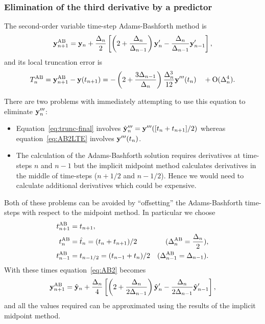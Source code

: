 \subsubsection{Elimination of the third derivative by a predictor}
The second-order variable time-step Adams-Bashforth method is\cite[p.267]{Gresho-Sani}
\begin{equation}
  \mathbf{y}_{n+1}^{\text{AB}} = \mathbf{y}_n + \frac{\Delta_{n}}{2} \left[
    \left (2 + \frac{\Delta_{n}}{\Delta_{n-1}} \right) \mathbf{y}'_n
    - \frac{\Delta_{n}}{\Delta_{n-1}} \mathbf{y}'_{n-1}
    \right],
  \label{eq:AB2}
\end{equation}
and its local truncation error is\cite[p.267]{Gresho-Sani}
\begin{equation}
  T_n^{\text{AB}} = \mathbf{y}_{n+1}^{\text{AB}} - \mathbf{y}(t_{n+1})
  = - \left( 2 + \frac{3 \Delta_{n-1}}{\Delta_{n}} \right) \frac{\Delta_{n}^3}{12} \mathbf{y}'''(t_n)
  \quad + \text{O}(\Delta_{n}^4).
  \label{eq:AB2LTE}
\end{equation}


There are two problems with immediately attempting to use this equation to eliminate $\mathbf{y}'''_n$:
\begin{itemize}
\item Equation~\eqref{eq:trunc-final} involves $\hat{\mathbf{y}}_{n}''' = \mathbf{y}'''([t_n +t_{n+1}]/2)$ whereas equation~\eqref{eq:AB2LTE} involves $\mathbf{y}'''(t_n)$.
\item The calculation of the Adams-Bashforth solution requires derivatives at time-steps $n$ and $n-1$ but the implicit midpoint method calculates derivatives in the middle of time-steps (\ie $n+ 1/2$ and $n - 1/2$).
  Hence we would need to calculate additional derivatives which could be expensive.
\end{itemize}

Both of these problems can be avoided by ``offsetting'' the Adams-Bashforth time-steps with respect to the midpoint method.
In particular we choose
\begin{align}
  t_{n+1}^{\text{AB}} &= t_{n+1}, \notag\\
  t_n^{\text{AB}} &= \hat{t}_{n} = (t_{n} + t_{n+1})/2 &(\Delta_{n}^{\text{AB}} = \frac{\Delta_{n}}{2}), \notag \\
  t_{n-1}^{\text{AB}} &= t_{n - 1/2} = (t_{n-1} + t_n)/2  &(\Delta_{n-1}^{\text{AB}} = \Delta_{n-1}).
  \label{eq:ab2-ts}
\end{align}
With these times equation~\eqref{eq:AB2} becomes
\begin{equation}
   \mathbf{y}_{n+1}^{\text{AB}} = \hat{\mathbf{y}}_{n} + \frac{\Delta_{n}}{4} \left[
     \left (2 + \frac{\Delta_{n}}{2\Delta_{n-1}} \right) \hat{\mathbf{y}}_{n}'
     - \frac{\Delta_{n}}{2\Delta_{n-1}} \hat{\mathbf{y}}_{n-1}'
     \right],
   \label{eq:AB2-mid}
\end{equation}
and all the values required can be approximated using the results of the implicit midpoint method.

